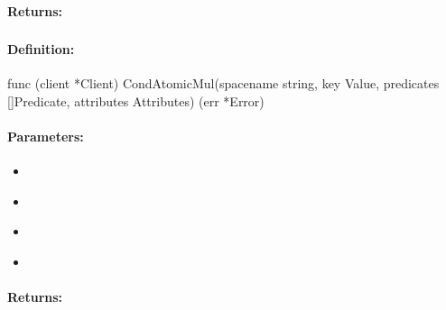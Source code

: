 \paragraph{Returns:}


\pagebreak
\subsubsection{}
\label{api:Go:CondAtomicMul}


\paragraph{Definition:}
\begin{gocode}
func (client *Client) CondAtomicMul(spacename string, key Value, predicates []Predicate, attributes Attributes) (err *Error)
\end{gocode}

\paragraph{Parameters:}
\begin{itemize}[noitemsep]
\item {}\\

\item {}\\

\item {}\\

\item {}\\

\end{itemize}

\paragraph{Returns:}


\pagebreak
\subsubsection{}
\label{api:Go:GroupAtomicMul}


